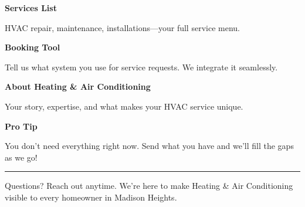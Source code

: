 \documentclass[11pt,letterpaper]{article}
\begin{document}
\begin{minipage}[t]{0.48\textwidth}
\begin{tcolorbox}[colframe=accent-teal, boxrule=1pt, left=0.7em, right=0.7em, top=0.5em, bottom=0.5em, arc=4pt, boxsep=0pt]
{\bfseries\small\color{accent-teal}Services List}

\vspace{0.15em}

{\small HVAC repair, maintenance, installations—your full service menu.}
\end{tcolorbox}

\vspace{0.1em}

\begin{tcolorbox}[colframe=accent-teal, boxrule=1pt, left=0.7em, right=0.7em, top=0.5em, bottom=0.5em, arc=4pt, boxsep=0pt]
{\bfseries\small\color{accent-teal}Booking Tool}

\vspace{0.15em}

{\small Tell us what system you use for service requests. We integrate it seamlessly.}
\end{tcolorbox}

\vspace{0.1em}

\begin{tcolorbox}[colframe=accent-teal, boxrule=1pt, left=0.7em, right=0.7em, top=0.5em, bottom=0.5em, arc=4pt, boxsep=0pt]
{\bfseries\small\color{accent-teal}About Heating \& Air Conditioning}

\vspace{0.15em}

{\small Your story, expertise, and what makes your HVAC service unique.}
\end{tcolorbox}

\vspace{-0.2em}
\end{minipage}

\vspace{0.15em}

\begin{tcolorbox}[colback={accent-red!5}, colframe=accent-red!20, boxrule=0.5pt, left=0.7em, right=0.7em, top=0.4em, bottom=0.4em, arc=6pt, boxsep=0pt]

{\bfseries\small\color{accent-red}Pro Tip}

\vspace{0.1em}

{\small You don't need everything right now. Send what you have and we'll fill the gaps as we go!}

\end{tcolorbox}

\vspace{0.15em}

\noindent\hrule
\vspace{0.2em}

{\small\color{text-light}Questions? Reach out anytime. We're here to make Heating \& Air Conditioning visible to every homeowner in Madison Heights.}
\end{document}

